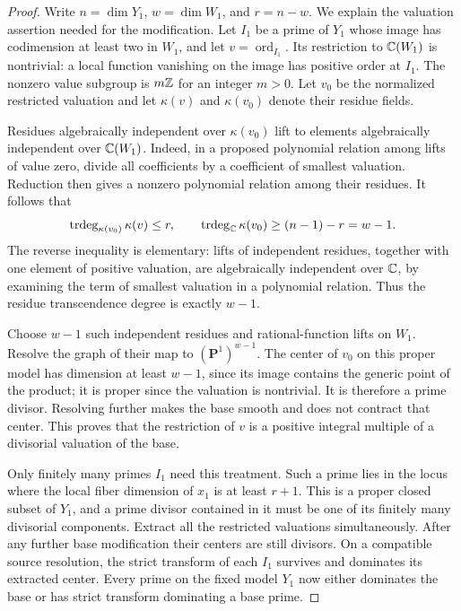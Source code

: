 \begin{proof}
Write \(n=\dim Y_1\), \(w=\dim W_1\), and \(r=n-w\).  We explain the
valuation assertion needed for the modification.  Let \(I_1\) be a prime
of \(Y_1\) whose image has codimension at least two in \(W_1\), and let
\(v=\operatorname{ord}_{I_1}\).  Its restriction to \(\mathbb C(W_1)\) is
nontrivial: a local function vanishing on the image has positive order
at \(I_1\).  The nonzero value subgroup is \(m\mathbb Z\) for an integer
\(m>0\).  Let \(v_0\) be the normalized restricted valuation and let
\(\kappa(v)\) and \(\kappa(v_0)\) denote their residue fields.

Residues algebraically independent over \(\kappa(v_0)\) lift to elements
algebraically independent over \(\mathbb C(W_1)\).  Indeed, in a proposed
polynomial relation among lifts of value zero, divide all coefficients
by a coefficient of smallest valuation.  Reduction then gives a
nonzero polynomial relation among their residues.  It follows that
\[
 \operatorname{trdeg}_{\kappa(v_0)}\kappa(v)\le r,
 \qquad
 \operatorname{trdeg}_{\mathbb C}\kappa(v_0)\ge(n-1)-r=w-1.
\]
The reverse inequality is elementary: lifts of independent residues,
together with one element of positive valuation, are algebraically
independent over \(\mathbb C\), by examining the term of smallest valuation
in a polynomial relation.  Thus the residue transcendence degree is
exactly \(w-1\).

Choose \(w-1\) such independent residues and rational-function lifts on
\(W_1\).  Resolve the graph of their map to \((\mathbf P^1)^{w-1}\).
The center of \(v_0\) on this proper model has dimension at least
\(w-1\), since its image contains the generic point of the product;
it is proper since the valuation is nontrivial.  It is therefore a
prime divisor.  Resolving further makes the base smooth and does not
contract that center.  This proves that the restriction of \(v\) is a
positive integral multiple of a divisorial valuation of the base.

Only finitely many primes \(I_1\) need this treatment.  Such a prime
lies in the locus where the local fiber dimension of \(x_1\) is at
least \(r+1\).  This is a proper closed subset of \(Y_1\), and a prime
divisor contained in it must be one of its finitely many divisorial
components.  Extract all the restricted valuations simultaneously.
After any further base modification their centers are still divisors.
On a compatible source resolution, the strict transform of each
\(I_1\) survives and dominates its extracted center.  Every prime on
the fixed model \(Y_1\) now either dominates the base or has strict
transform dominating a base prime.


\end{proof}

